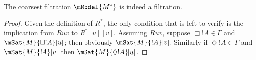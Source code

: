 \documentclass[../../../include/open-logic-section]{subfiles}
\begin{document}
\begin{prop}
  The coarsest filtration $\mModel{M^*}$ is indeed a filtration. 
\end{prop}

\begin{proof}
  Given the definition of $R^*$, the only condition that is left to
  verify is the implication from $Ruv$ to $R^*[u][v]$. Assuming $Ruv$,
  suppose $\Box!A \in \Gamma$ and $\mSat{M}{\Box!A}[u]$; then
  obviously $\mSat{M}{!A}[v]$. Similarly if $\Diamond!A \in
  \Gamma$ and $\mSat{M}{!A}[v]$ then $\mSat{M}{\Diamond!A}[u]$. 
\end{proof}
\end{document}
